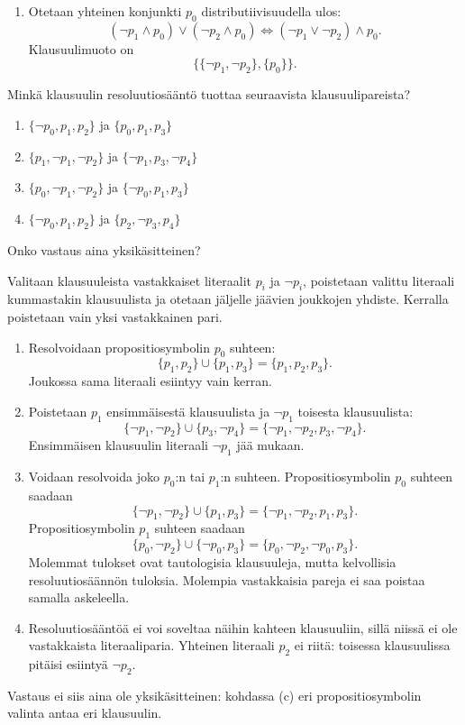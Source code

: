 \documentclass[11pt,a4paper]{amsart}
\begin{document}
\begin{solution}
\begin{enumerate}[label=\alph*)]
\item Otetaan yhteinen konjunkti \(p_0\) distributiivisuudella ulos:
  \[
    (\neg p_1\land p_0)\lor(\neg p_2\land p_0)
    \iff (\neg p_1\lor\neg p_2)\land p_0.
  \]
  Klausuulimuoto on
  \[
    \big\{\{\neg p_1,\neg p_2\},\{p_0\}\big\}.
  \]
\end{enumerate}
\end{solution}

\begin{exercise}
Minkä klausuulin resoluutiosääntö tuottaa seuraavista klausuulipareista?
\begin{enumerate}[label=\alph*), nosep]
\item \(\{\neg p_0, p_1, p_2\}\) ja \(\{p_0, p_1, p_3\}\)
\item \(\{p_1, \neg p_1, \neg p_2\}\) ja \(\{\neg p_1, p_3, \neg p_4\}\)
\item \(\{p_0, \neg p_1, \neg p_2\}\) ja \(\{\neg p_0, p_1, p_3\}\)
\item \(\{\neg p_0, p_1, p_2\}\) ja \(\{p_2, \neg p_3, p_4\}\)
\end{enumerate}
Onko vastaus aina yksikäsitteinen?
\end{exercise}

\begin{solution}
Valitaan klausuuleista vastakkaiset literaalit \(p_i\) ja \(\neg p_i\),
poistetaan valittu literaali kummastakin klausuulista ja otetaan jäljelle
jäävien joukkojen yhdiste. Kerralla poistetaan vain yksi vastakkainen pari.
\begin{enumerate}[label=\alph*)]
\item Resolvoidaan propositiosymbolin \(p_0\) suhteen:
\[
\{p_1,p_2\}\cup\{p_1,p_3\}=\{p_1,p_2,p_3\}.
\]
Joukossa sama literaali esiintyy vain kerran.

\item Poistetaan \(p_1\) ensimmäisestä klausuulista ja \(\neg p_1\)
toisesta klausuulista:
\[
\{\neg p_1,\neg p_2\}\cup\{p_3,\neg p_4\}
=\{\neg p_1,\neg p_2,p_3,\neg p_4\}.
\]
Ensimmäisen klausuulin literaali \(\neg p_1\) jää mukaan.

\item Voidaan resolvoida joko \(p_0\):n tai \(p_1\):n suhteen.
Propositiosymbolin \(p_0\) suhteen saadaan
\[
\{\neg p_1,\neg p_2\}\cup\{p_1,p_3\}
=\{\neg p_1,\neg p_2,p_1,p_3\}.
\]
Propositiosymbolin \(p_1\) suhteen saadaan
\[
\{p_0,\neg p_2\}\cup\{\neg p_0,p_3\}
=\{p_0,\neg p_2,\neg p_0,p_3\}.
\]
Molemmat tulokset ovat tautologisia klausuuleja, mutta kelvollisia
resoluutiosäännön tuloksia. Molempia vastakkaisia pareja ei saa poistaa
samalla askeleella.

\item Resoluutiosääntöä ei voi soveltaa näihin kahteen klausuuliin,
sillä niissä ei ole vastakkaista literaaliparia. Yhteinen literaali
\(p_2\) ei riitä: toisessa klausuulissa pitäisi esiintyä \(\neg p_2\).
\end{enumerate}
Vastaus ei siis aina ole yksikäsitteinen: kohdassa (c) eri
propositiosymbolin valinta antaa eri klausuulin.
\end{solution}
\end{document}
